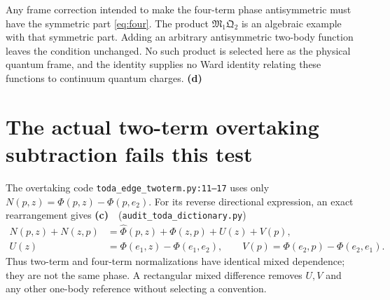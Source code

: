 \documentclass[11pt,a4paper]{article}
\newcommand{\Lc}{\textbf{(c)}\ }
\newcommand{\Ld}{\textbf{(d)}\ }
\newcommand{\scr}{\texttt{audit\_\allowbreak toda\_\allowbreak dictionary.py}}
\begin{document}
Any frame correction intended to make the four-term phase antisymmetric
must have the symmetric part \eqref{eq:four}. The product
$\mathfrak M_1\mathfrak Q_2$ is an algebraic example with that symmetric
part. Adding an arbitrary antisymmetric two-body function leaves the
condition unchanged. No such product is selected here as the physical
quantum frame, and the identity supplies no Ward identity relating these
functions to continuum quantum charges. \Ld

\section{The actual two-term overtaking subtraction fails this test}
The overtaking code \texttt{toda\_\allowbreak edge\_\allowbreak twoterm.py:11--17} uses only
$N(p,z)=\Phi(p,z)-\Phi(p,e_2)$. For its reverse directional expression,
an exact rearrangement gives \Lc\ (\scr)
\begin{align}
 N(p,z)+N(z,p)
 &=\widehat\Phi(p,z)+\widehat\Phi(z,p)+U(z)+V(p),\\
 U(z)&=\Phi(e_1,z)-\Phi(e_1,e_2),\qquad
 V(p)=\Phi(e_2,p)-\Phi(e_2,e_1).
\end{align}
Thus two-term and four-term normalizations have identical mixed dependence;
they are not the same phase. A rectangular mixed difference removes $U,V$
and any other one-body reference without selecting a convention.
\end{document}
